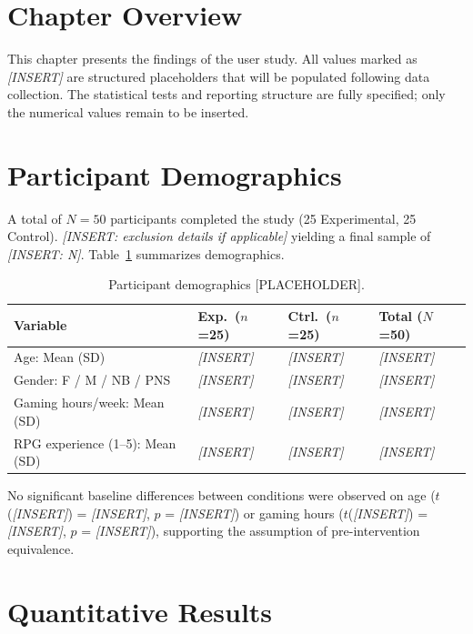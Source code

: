 \documentclass[12pt,a4paper]{report}
\begin{document}
\section{Chapter Overview}

This chapter presents the findings of the user study. All values marked as \textit{[INSERT]} are structured placeholders that will be populated following data collection. The statistical tests and reporting structure are fully specified; only the numerical values remain to be inserted.

\section{Participant Demographics}

A total of $N = 50$ participants completed the study (25 Experimental, 25 Control). \textit{[INSERT: exclusion details if applicable]} yielding a final sample of \textit{[INSERT: N]}. Table~\ref{tab:demographics} summarizes demographics.

\begin{table}[H]
\centering
\caption{Participant demographics [PLACEHOLDER].}
\label{tab:demographics}
\small
\begin{tabular}{@{}llll@{}}
\toprule
\textbf{Variable} & \textbf{Exp.\ ($n$=25)} & \textbf{Ctrl.\ ($n$=25)} & \textbf{Total ($N$=50)} \\
\midrule
Age: Mean (SD) & \textit{[INSERT]} & \textit{[INSERT]} & \textit{[INSERT]} \\
Gender: F / M / NB / PNS & \textit{[INSERT]} & \textit{[INSERT]} & \textit{[INSERT]} \\
Gaming hours/week: Mean (SD) & \textit{[INSERT]} & \textit{[INSERT]} & \textit{[INSERT]} \\
RPG experience (1--5): Mean (SD) & \textit{[INSERT]} & \textit{[INSERT]} & \textit{[INSERT]} \\
\bottomrule
\end{tabular}
\end{table}

No significant baseline differences between conditions were observed on age ($t$(\textit{[INSERT]}) = \textit{[INSERT]}, $p$ = \textit{[INSERT]}) or gaming hours ($t$(\textit{[INSERT]}) = \textit{[INSERT]}, $p$ = \textit{[INSERT]}), supporting the assumption of pre-intervention equivalence.

\section{Quantitative Results}
\end{document}
